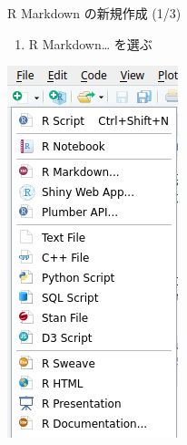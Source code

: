 \documentclass[
  ignorenonframetext,
]{beamer}
\providecommand{\tightlist}{%
  \setlength{\itemsep}{0pt}\setlength{\parskip}{0pt}}
\begin{document}
\begin{frame}{R Markdown の新規作成 (1/3)}
\protect\hypertarget{r-markdown-ux306eux65b0ux898fux4f5cux6210-13}{}
\begin{enumerate}
\tightlist
\item
  R Markdown\ldots{} を選ぶ
\end{enumerate}

\begin{center}\includegraphics[width=1\linewidth,height=1\textheight,keepaspectratio]{img/newfile} \end{center}
\end{frame}
\end{document}
